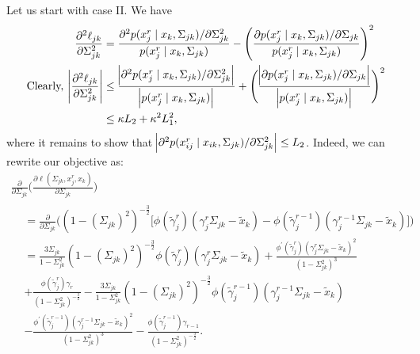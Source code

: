 \begin{condition}
    Let us start with case II. We have
    \begin{equation}\label{hessian_case2} 
        \begin{split}
            \frac{\partial^2\ell_{jk}}{\partial \Sigma_{jk}^{2}} &= \frac{\partial^2 p(x_j^{r} \mid x_{k}, \Sigma_{jk})/\partial \Sigma_{jk}^{2}}{p(x_j^{r} \mid x_{k}, \Sigma_{jk})} - \Bigg(\frac{\partial p(x_j^{r} \mid x_{k}, \Sigma_{jk}) / \partial \Sigma_{jk}}{p(x_j^{r} \mid x_{k}, \Sigma_{jk})}\Bigg)^2 \\
            \text{Clearly, } \abs{\frac{\partial^2\ell_{jk}}{\partial \Sigma_{jk}^{2}}} &\leq \frac{\abs{\partial^2 p(x_j^{r} \mid x_{k}, \Sigma_{jk})/\partial \Sigma_{jk}^{2}}}{\abs{p(x_j^{r} \mid x_{k}, \Sigma_{jk})}} + \Bigg( \frac{\abs{\partial p(x_j^{r} \mid x_{k}, \Sigma_{jk}) / \partial \Sigma_{jk}}}{\abs{p(x_j^{r} \mid x_{k}, \Sigma_{jk})}} \Bigg)^2 \\
            &\leq \kappa L_2 + \kappa^2 L_1^2,
        \end{split}
    \end{equation}
    where it remains to show that $\abs{\partial^2 p(x_{ij}^{r} \mid x_{ik}, \Sigma_{jk})/\partial \Sigma_{jk}^{2}} \leq L_2$. Indeed, we can rewrite our objective as:
    \begin{multline}\label{second_derivative_case2}
            \frac{\partial}{\partial \Sigma_{jk}} \Bigg(\frac{\partial\ell(\Sigma_{jk}, x_j^r,x_k)}{\partial \Sigma_{jk}}\Bigg) \\
            \begin{aligned}
            &= \frac{\partial}{\partial \Sigma_{jk}}\Bigg( (1-(\Sigma_{jk})^2)^{-\frac{3}{2}} \Bigg[\phi({\tilde{\gamma}}_j^{r})({\gamma}_j^r\Sigma_{jk} - {\tilde{x}}_{k}) - \phi({\tilde{\gamma}}_j^{r-1})({\gamma}_j^{r-1}\Sigma_{jk} - {\tilde{x}}_{k})\Bigg] \Bigg) \\
            &= \frac{3\Sigma_{jk}}{1-\Sigma_{jk}^2} (1-(\Sigma_{jk})^2)^{-\frac{3}{2}} \phi({\tilde{\gamma}}_j^{r})({\gamma}_j^r\Sigma_{jk} - {\tilde{x}}_{k}) + \frac{\phi^\prime({\tilde{\gamma}}_j^{r})({\gamma}_j^r\Sigma_{jk} - {\tilde{x}}_{k})^2}{(1-\Sigma_{jk}^2)^3} \\
            &+ \frac{\phi({\tilde{\gamma}}_j^{r}){\gamma}_{r}}{(1-\Sigma_{jk}^2)^{-\frac{3}{2}}} - \frac{3\Sigma_{jk}}{1-\Sigma_{jk}^2} (1-(\Sigma_{jk})^2)^{-\frac{3}{2}} \phi({\tilde{\gamma}}_j^{r-1})({\gamma}_j^{r-1}\Sigma_{jk} - {\tilde{x}}_{k}) \\
            &-  \frac{\phi^\prime({\tilde{\gamma}}_j^{r-1})({\gamma}_j^{r-1}\Sigma_{jk} - {\tilde{x}}_{k})^2}{(1-\Sigma_{jk}^2)^3} - \frac{\phi({\tilde{\gamma}}_j^{r-1}){\gamma}_{r-1}}{(1-\Sigma_{jk}^2)^{-\frac{3}{2}}}.

\end{aligned}
\end{multline}
\end{condition}
